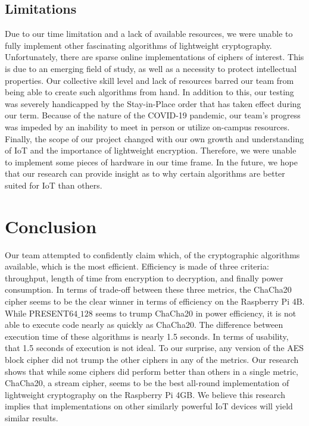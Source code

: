 \documentclass[conference]{IEEEtran}
\begin{document}
\subsection{Limitations}
Due to our time limitation and a lack of available resources, we were unable to fully implement other fascinating algorithms of lightweight cryptography. Unfortunately, there are sparse online implementations of ciphers of interest. This is due to an emerging field of study, as well as a necessity to protect intellectual properties. Our collective skill level and lack of resources barred our team from being able to create such algorithms from hand.
In addition to this, our testing was severely handicapped by the Stay-in-Place order that has taken effect during our term. Because of the nature of the COVID-19 pandemic, our team’s progress was impeded by an inability to meet in person or utilize on-campus resources. 
Finally, the scope of our project changed with our own growth and understanding of IoT and the importance of lightweight encryption. Therefore, we were unable to implement some pieces of hardware in our time frame.
In the future, we hope that our research can provide insight as to why certain algorithms are better suited for IoT than others. 

\section{Conclusion}
Our team attempted to confidently claim which, of the cryptographic algorithms available, which is the most efficient. Efficiency is made of three criteria: throughput, length of time from encryption to decryption, and finally power consumption. In terms of trade-off between these three metrics, the ChaCha20 cipher seems to be the clear winner in terms of efficiency on the Raspberry Pi 4B. While PRESENT$64\_128$ seems to trump ChaCha20 in power efficiency, it is not able to execute code nearly as quickly as ChaCha20. The difference between execution time of these algorithms is nearly 1.5 seconds. In terms of usability, that 1.5 seconds of execution is not ideal. To our surprise, any version of the AES block cipher did not trump the other ciphers in any of the metrics. Our research shows that while some ciphers did perform better than others in a single metric, ChaCha20, a stream cipher, seems to be the best all-round implementation of lightweight cryptography on the Raspberry Pi 4GB. We believe this research implies that implementations on other similarly powerful IoT devices will yield similar results.
\end{document}
